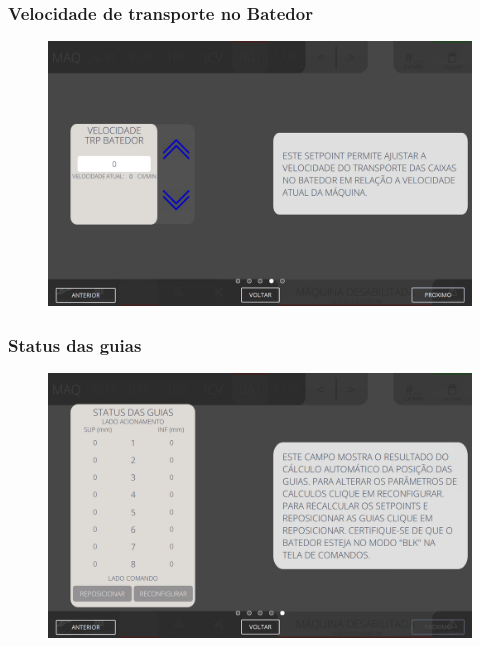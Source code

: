 \newpage
\thispagestyle{fancy}
\vspace*{40 pt}
\subsubsection{\small{Velocidade de transporte no Batedor}} \label{sec:telaConfiguracoesBatedorVelocidadeTransporteBatedor}
\vspace*{\fill}
\begin{figure}[h]
    \centering
    \includegraphics[width=576 px,height=360 px]{src/imagesICV/07-scout/settings/e-4.png}
\end{figure}
\vspace*{\fill}

\newpage
\thispagestyle{fancy}
\vspace*{40 pt}
\subsubsection{\small{Status das guias}} \label{sec:telaConfiguracoesBatedorStatusGuias}
\vspace*{\fill}
\begin{figure}[h]
    \centering
    \includegraphics[width=576 px,height=360 px]{src/imagesICV/07-scout/settings/e-5.png}
\end{figure}
\vspace*{\fill}

